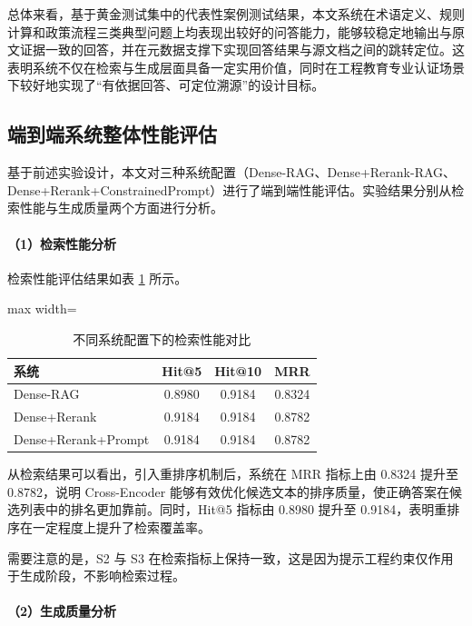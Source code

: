 \documentclass[UTF8,a4paper,zihao=-4]{ctexart}
\begin{document}
总体来看，基于黄金测试集中的代表性案例测试结果，本文系统在术语定义、规则计算和政策流程三类典型问题上均表现出较好的问答能力，能够较稳定地输出与原文证据一致的回答，并在元数据支撑下实现回答结果与源文档之间的跳转定位。这表明系统不仅在检索与生成层面具备一定实用价值，同时在工程教育专业认证场景下较好地实现了“有依据回答、可定位溯源”的设计目标。
\subsection{端到端系统整体性能评估}

基于前述实验设计，本文对三种系统配置（Dense-RAG、Dense+Rerank-RAG、Dense+Rerank+ConstrainedPrompt）进行了端到端性能评估。实验结果分别从检索性能与生成质量两个方面进行分析。

\paragraph{（1）检索性能分析}

检索性能评估结果如表 \ref{tab:retrieval_result} 所示。

\begin{table}[H]
\centering
\caption{不同系统配置下的检索性能对比}
\label{tab:retrieval_result}
{\small
\renewcommand{\arraystretch}{1.2}
\begin{adjustbox}{max width=\textwidth}
\begin{tabular}{lccc}
\toprule
系统 & Hit@5 & Hit@10 & MRR \\
\midrule
Dense-RAG & 0.8980 & 0.9184 & 0.8324 \\
Dense+Rerank & 0.9184 & 0.9184 & 0.8782 \\
Dense+Rerank+Prompt & 0.9184 & 0.9184 & 0.8782 \\
\bottomrule
\end{tabular}
\end{adjustbox}
}
\end{table}

从检索结果可以看出，引入重排序机制后，系统在 MRR 指标上由 0.8324 提升至 0.8782，说明 Cross-Encoder 能够有效优化候选文本的排序质量，使正确答案在候选列表中的排名更加靠前。同时，Hit@5 指标由 0.8980 提升至 0.9184，表明重排序在一定程度上提升了检索覆盖率。

需要注意的是，S2 与 S3 在检索指标上保持一致，这是因为提示工程约束仅作用于生成阶段，不影响检索过程。

\paragraph{（2）生成质量分析}
\end{document}
